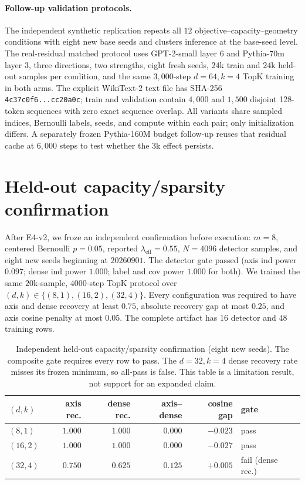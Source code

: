 \documentclass{article}
\theoremstyle{plain}
\begin{document}
{\paragraph{Follow-up validation protocols.}
The independent synthetic replication repeats all $12$ objective--capacity--geometry conditions with eight new base seeds and clusters inference at the base-seed level. The real-residual matched protocol uses GPT-2-small layer $6$ and Pythia-70m layer $3$, three directions, two strengths, eight fresh seeds, $24$k train and $24$k held-out samples per condition, and the same $3{,}000$-step $d{=}64,k{=}4$ TopK training in both arms. The explicit WikiText-2 text file has SHA-256 \texttt{4c37c0f6...cc20a0c}; train and validation contain $4{,}000$ and $1{,}500$ disjoint 128-token sequences with zero exact sequence overlap. All variants share sampled indices, Bernoulli labels, seeds, and compute within each pair; only initialization differs. A separately frozen Pythia-160M budget follow-up reuses that residual cache at $6{,}000$ steps to test whether the $3$k effect persists.

\section{Held-out capacity/sparsity confirmation}
\label{app:confirm}
After E4-v2, we froze an independent confirmation before execution: $m=8$, centered Bernoulli $p=0.05$, reported $\lambda_{\mathrm{eff}}=0.55$, $N=4096$ detector samples, and eight new seeds beginning at $20260901$. The detector gate passed (axis ind power $0.097$; dense ind power $1.000$; label and cov power $1.000$ for both). We trained the same $20$k-sample, $4000$-step TopK protocol over $(d,k)\in\{(8,1),(16,2),(32,4)\}$. Every configuration was required to have axis and dense recovery at least $0.75$, absolute recovery gap at most $0.25$, and axis cosine penalty at most $0.05$. The complete artifact has $16$ detector and $48$ training rows.

\begin{table}[h]
\caption{Independent held-out capacity/sparsity confirmation (eight new seeds). The composite gate requires every row to pass. The $d{=}32,k{=}4$ dense recovery rate misses its frozen minimum, so all-pass is false. This table is a limitation result, not support for an expanded claim.}
\label{tab:confirm}
\begin{center}
\scriptsize
\begin{tabular}{@{}lrrrrl@{}}
\toprule
$(d,k)$ & axis rec. & dense rec. & axis--dense & cosine gap & gate \\
\midrule
$(8,1)$ & $1.000$ & $1.000$ & $0.000$ & $-0.023$ & pass \\
$(16,2)$ & $1.000$ & $1.000$ & $0.000$ & $-0.027$ & pass \\
$(32,4)$ & $0.750$ & $0.625$ & $0.125$ & $+0.005$ & fail (dense rec.) \\
\bottomrule
\end{tabular}
\end{center}
\end{table}

}
\end{document}
